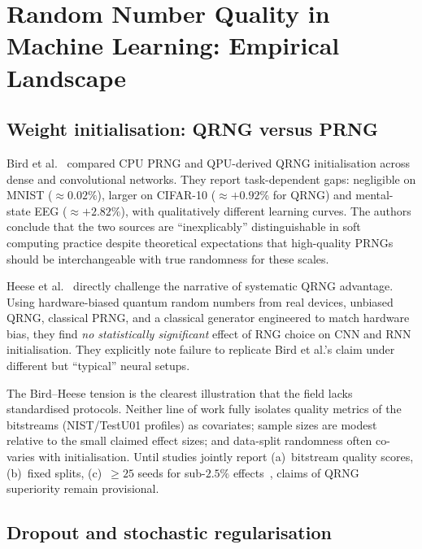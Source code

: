 \section{Random Number Quality in Machine Learning: Empirical Landscape}
\label{sec:rngml}

\subsection{Weight initialisation: QRNG versus PRNG}

Bird et al.~\cite{bird2019softcomputing} compared CPU PRNG and QPU-derived QRNG initialisation across dense and convolutional networks.
They report task-dependent gaps: negligible on MNIST ($\approx 0.02\%$), larger on CIFAR-10 ($\approx +0.92\%$ for QRNG) and mental-state EEG ($\approx +2.82\%$), with qualitatively different learning curves.
The authors conclude that the two sources are ``inexplicably'' distinguishable in soft computing practice despite theoretical expectations that high-quality PRNGs should be interchangeable with true randomness for these scales.

Heese et al.~\cite{heese2024biased} directly challenge the narrative of systematic QRNG advantage.
Using hardware-biased quantum random numbers from real devices, unbiased QRNG, classical PRNG, and a classical generator engineered to match hardware bias, they find \emph{no statistically significant} effect of RNG choice on CNN and RNN initialisation.
They explicitly note failure to replicate Bird et al.'s claim under different but ``typical'' neural setups.

\begin{remark}
The Bird--Heese tension is the clearest illustration that the field lacks standardised protocols.
Neither line of work fully isolates quality metrics of the bitstreams (NIST/TestU01 profiles) as covariates; sample sizes are modest relative to the small claimed effect sizes; and data-split randomness often co-varies with initialisation.
Until studies jointly report (a)~bitstream quality scores, (b)~fixed splits, (c)~$\geq 25$ seeds for sub-$2.5\%$ effects~\cite{akesson2024reporting}, claims of QRNG superiority remain provisional.
\end{remark}

\subsection{Dropout and stochastic regularisation}

